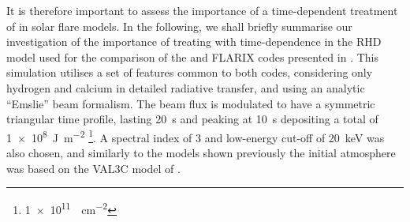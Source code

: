 It is therefore important to assess the importance of a time-dependent treatment of \Caii{} in solar flare models.
In the following, we shall briefly summarise our investigation of the importance of treating \Caii{} with time-dependence in the RHD model used for the comparison of the \Radyn{} and FLARIX codes presented in \citet{Kasparova2019}.
This simulation utilises a set of features common to both codes, considering only hydrogen and calcium in detailed radiative transfer, and using an analytic ``Emslie'' beam formalism.
The beam flux is modulated to have a symmetric triangular time profile, lasting \SI{20}{\second} and peaking at \SI{10}{\second} depositing a total of \SI{1e8}{\joule\per\square\metre} \footnote{\SI{1e11}{\erg\per\square\centi\metre}}.
A spectral index of 3 and low-energy cut-off of \SI{20}{\kilo\electronvolt} was also chosen, and similarly to the models shown previously the initial atmosphere was based on the VAL3C model of \citet{Vernazza1981}.





